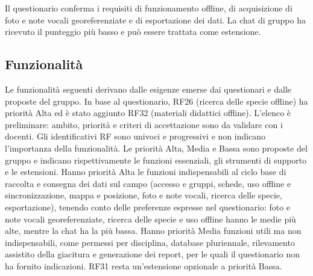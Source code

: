 Il questionario conferma i requisiti di funzionamento offline, di acquisizione di foto e note vocali georeferenziate e di esportazione dei dati. La chat di gruppo ha ricevuto il punteggio più basso e può essere trattata come estensione.

\subsection{Funzionalità}
Le funzionalità seguenti derivano dalle esigenze emerse dai questionari e dalle proposte del gruppo. In base al questionario, RF26 (ricerca delle specie offline) ha priorità Alta ed è stato aggiunto RF32 (materiali didattici offline). L'elenco è preliminare: ambito, priorità e criteri di accettazione sono da validare con i docenti. Gli identificativi RF sono univoci e progressivi e non indicano l'importanza della funzionalità. Le priorità Alta, Media e Bassa sono proposte del gruppo e indicano rispettivamente le funzioni essenziali, gli strumenti di supporto e le estensioni. Hanno priorità Alta le funzioni indispensabili al ciclo base di raccolta e consegna dei dati sul campo (accesso e gruppi, schede, uso offline e sincronizzazione, mappa e posizione, foto e note vocali, ricerca delle specie, esportazione), tenendo conto delle preferenze espresse nel questionario: foto e note vocali georeferenziate, ricerca delle specie e uso offline hanno le medie più alte, mentre la chat ha la più bassa. Hanno priorità Media funzioni utili ma non indispensabili, come permessi per disciplina, database pluriennale, rilevamento assistito della giacitura e generazione dei report, per le quali il questionario non ha fornito indicazioni. RF31 resta un'estensione opzionale a priorità Bassa.

